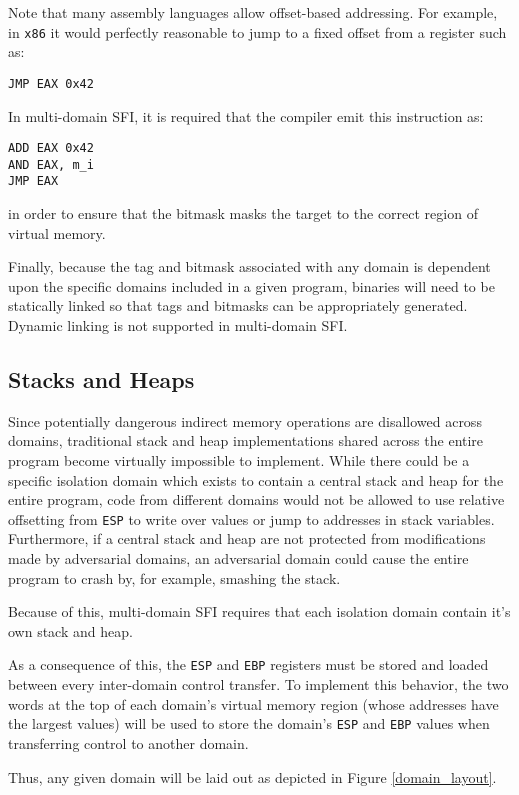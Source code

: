 \documentclass[12pt]{IEEEtran}
\begin{document}
Note that many assembly languages allow offset-based addressing. For example, in \texttt{x86} it would perfectly reasonable to jump to a fixed offset from a register such as:
\begin{verbatim}
JMP EAX 0x42
\end{verbatim}
In multi-domain SFI, it is required that the compiler emit this instruction as:
\begin{verbatim}
ADD EAX 0x42
AND EAX, m_i
JMP EAX
\end{verbatim}
in order to ensure that the bitmask masks the target to the correct region of virtual memory.

Finally, because the tag and bitmask associated with any domain is dependent upon the specific domains included in a given program, binaries will need to be statically linked so that tags and bitmasks can be appropriately generated. Dynamic linking is not supported in multi-domain SFI.


\subsection{Stacks and Heaps}

Since potentially dangerous indirect memory operations are disallowed across domains, traditional stack and heap implementations shared across the entire program become virtually impossible to implement. While there could be a specific isolation domain which exists to contain a central stack and heap for the entire program, code from different domains would not be allowed to use relative offsetting from \texttt{ESP} to write over values or jump to addresses in stack variables. Furthermore, if a central stack and heap are not protected from modifications made by adversarial domains, an adversarial domain could cause the entire program to crash by, for example, smashing the stack.

Because of this, multi-domain SFI requires that each isolation domain contain it's own stack and heap.

As a consequence of this, the  \texttt{ESP} and \texttt{EBP} registers must be stored and loaded between every inter-domain control transfer. To implement this behavior, the two words at the top of each domain's virtual memory region (whose addresses have the largest values) will be used to store the domain's \texttt{ESP} and \texttt{EBP} values when transferring control to another domain.

Thus, any given domain will be laid out as depicted in Figure \ref{domain_layout}.
\end{document}

